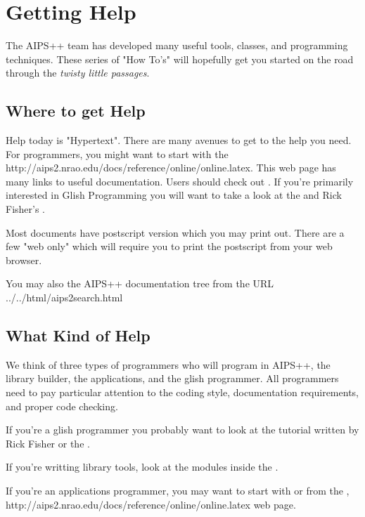 \chapter{Getting Help}

The AIPS++ team has developed many useful tools, classes, and programming
techniques.  These series of "How To's"
will hopefully get you started on the road through the \textit{twisty little
passages}. 

\section{Where to get Help}
Help today is "Hypertext". There are many avenues to get to the help
you need.  For programmers, you might want to start with the 
http://aips2.nrao.edu/docs/reference/online/online.latex.
This web page has many links to useful documentation. Users should check
out \textbf{}.  If you're primarily interested in
Glish Programming you will want to take a look at the \textbf{} and Rick Fisher's \textbf{}.

Most documents have postscript version which you may print out.  There are
a few "web only" which will require you to print the postscript from your
web browser.  

You may also  the
AIPS++ documentation tree from the URL 
{../../html/aips2search.html}
\section{What Kind of Help}
We think of three types of programmers who will program in AIPS++,
the library builder, the applications, and the glish programmer.
All programmers need to pay particular attention to the coding
style, documentation requirements, and proper code checking.

If you're a glish programmer you probably want to look at the 
tutorial written by Rick Fisher or the \textbf{}.

If you're writting library tools, look at the modules inside the
.

If you're an applications programmer, you may want to start with
\textbf{}
or from the 
,
http://aips2.nrao.edu/docs/reference/online/online.latex web page.
